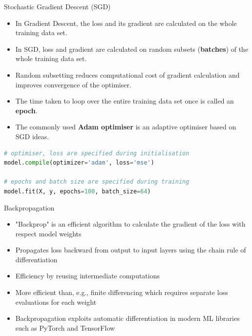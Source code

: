 \documentclass{beamer}
\begin{document}
\begin{frame}[fragile]{Stochastic Gradient Descent (SGD)}
\begin{itemize}
\item In Gradient Descent, the loss and its gradient are calculated on the whole training data set.
\item In SGD, loss and gradient are calculated on random subsets (\textbf{batches}) of the whole training data set.
\item Random subsetting reduces computational cost of gradient calculation and improves convergence of the optimiser.
\item The time taken to loop over the entire training data set once is called an \textbf{epoch}.
\item The commonly used \textbf{Adam optimiser} is an adaptive optimiser based on SGD ideas.
\end{itemize}
\vfill
\begin{lstlisting}[language=Python]
# optimiser, loss are specified during initialisation
model.compile(optimizer='adam', loss='mse')

# epochs and batch size are specified during training
model.fit(X, y, epochs=100, batch_size=64)
\end{lstlisting}
\end{frame}




\begin{frame}{Backpropagation}
\begin{itemize}
\item "Backprop" is an efficient algorithm to calculate the gradient of the loss with respect model weights
\item Propagates loss backward from output to input layers using the chain rule of differentiation
\item Efficiency by reusing intermediate computations
\item More efficient than, e.g., finite differencing which requires separate loss evaluations for each weight
\item Backpropagation exploits automatic differentiation in modern ML libraries such as PyTorch and TensorFlow
\end{itemize}
\end{frame}
\end{document}
